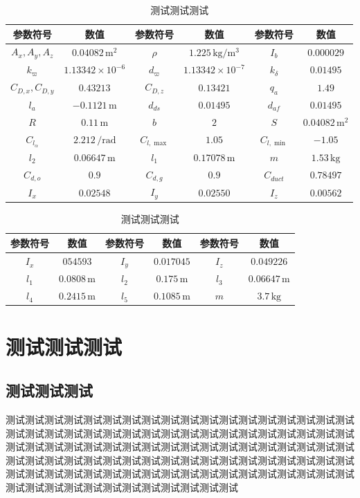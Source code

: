 \begin{table}
	\caption{\label{DF_para1}测试测试测试}
	\centering{}%
	\small 
	\begin{tabular}{cccccc}
		\hline 
		参数符号 & 数值&参数符号 & 数值&参数符号 & 数值\tabularnewline
		\hline 
		$ A_x,A_y,A_z $  & $ 0.04082\,\text{m}^2 $ &$ \rho $        &$1.225\,\text{kg}/\text{m}^3$&$ I_b $           & $ 0.000029 $               \tabularnewline
		$ k_{\varpi} $   & $1.13342 \times 10^{-6}$& $ d_{\varpi} $ & $1.13342 \times 10^{-7}$ 	  &$k_{\delta} $     & $ 0.01495 $ 			      \tabularnewline
		$C_{D,x},C_{D,y}$& $ 0.43213 $             &$ C_{D,z} $     & $ 0.13421 $             	  &	$ q_a $ 	     & $ 1.49 $ 				  \tabularnewline
		$ l_{a} $        & $ -0.1121\,\text{m} $   & $ d_{ds} $     & $ 0.01495 $			  	  &$ d_{af} $        & $ 0.01495 $    			  \tabularnewline
		$ R $            & $ 0.11\,\text{m} $      &$ b $           & $ 2 $       			   	  &$ S $ 			 & $ 0.04082\,\text{m}^2 $    \tabularnewline
		$C_{l_{\alpha}}$ & $ 2.212\,/\text{rad} $  &$C_{l, \max } $ & $ 1.05 $ 				   	  &$ C_{l, \min } $  & $ -1.05 $ 				  \tabularnewline
		$ l_2 $          & $ 0.06647\,\text{m} $   &$ l_1 $         & $ 0.17078\,\text{m} $    	  &	$ m $ 		     & $ 1.53\,\text{kg} $ 		  \tabularnewline
		$ C_{d, o } $    & $ 0.9 $                 &$ C_{d, g } $   & $ 0.9 $					  &$ C_{duct} $      & $ 0.78497 $	 			  \tabularnewline
		$ I_x $          & $ 0.02548 $ 			   &$ I_y $         & $ 0.02550 $                 &$ I_z $			 & $ 0.00562 $ 				  \tabularnewline
		\hline 
	\end{tabular}	
\end{table}

\begin{table}
	\caption{\label{TDF_para2}测试测试测试}
	\centering{}%
	\small 
	\begin{tabular}{cccccc}
		\hline 
		参数符号 & 数值&参数符号 & 数值&参数符号 & 数值\tabularnewline
		\hline 
		$ I_x $ & $ 054593 $ &$ I_y $ & $ 0.017045 $& $ I_z$ & $ 0.049226 $ \tabularnewline
		$ l_{1} $ & $ 0.0808\,\text{m} $&$ l_{2} $ & $ 0.175\,\text{m} $ &$ l_3 $ & $ 0.06647\,\text{m} $ \tabularnewline 
		$ l_4 $ & $ 0.2415\,\text{m} $ &$ l_5 $ & $ 0.1085\,\text{m} $& $ m $ & $ 3.7\,\text{kg} $ \tabularnewline
		\hline 
	\end{tabular}	%
\end{table}

\section{测试测试测试}
\subsection{测试测试测试}
%
测试测试测试测试测试测试测试测试测试测试测试测试测试测试测试测试测试测试测试测试测试测试测试测试测试测试测试测试测试测试测试测试测试测试测试测试测试测试测试测试测试测试测试测试测试测试测试测试测试测试测试测试测试测试测试测试测试测试测试测试测试测试测试测试测试测试测试测试测试测试测试测试测试测试测试测试测试测试测试测试测试测试测试测试测试测试测试测试测试测试测试测试测试测试测试测试测试测试测试测试测试测试

